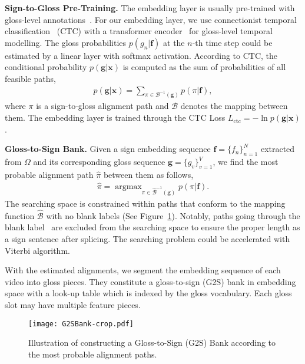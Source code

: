 \documentclass[final]{cvpr}
\begin{document}
\textbf{Sign-to-Gloss Pre-Training.}
The embedding layer is usually pre-trained with gloss-level annotations~\cite{slt-nslt-cihan18,slt-trans-cihan20}. 
For our embedding layer, we use connectionist temporal classification~\cite{CTCLoss} (CTC) with a transformer encoder~\cite{trans-vaswani17attention} for gloss-level temporal modelling.
The gloss probabilities $p(g_n|\mathbf{f})$ at the $n$-th time step could be estimated by a linear layer with softmax activation. 
According to CTC, the conditional probability $p(\mathbf{g} | \mathbf{x})$ is computed as the sum of probabilities of all feasible paths, 
\begin{align} \label{eq:gloss-predict}
   p(\mathbf{g} | \mathbf{x}) = \sum_{\pi \in \mathcal{B}^{-1}(\mathbf{g})}  p(\pi|\mathbf{f}),
\end{align}
where $\pi$ is a sign-to-gloss alignment path and $\mathcal{B}$ denotes the mapping between them. 
The embedding layer is trained through the CTC Loss $L_\text{ctc}=-\ln p(\mathbf{g}|\mathbf{x})$. 

\textbf{Gloss-to-Sign Bank.} 
Given a sign embedding sequence $\mathbf{f}=\{f_n\}_{n=1}^N$ extracted from $\Omega$ and its corresponding gloss sequence $\mathbf{g}=\{g_v\}_{v=1}^V$, 
we find the most probable alignment path $\hat{\pi}$ between them as follows, 
\begin{align} \label{eq:findpath}
   \hat{\pi} = \mathop{\arg\max}_{\pi \in \hat{\mathcal{B}}^{-1}(\mathbf{g})} p(\pi|\mathbf{f}).
\end{align}
The searching space is constrained within paths that conform to the mapping function $\hat{\mathcal{B}}$ with no blank labels (See Figure~\ref{fig:G2Sbank}). 
Notably, paths going through the blank label~\cite{CTCLoss} are excluded from the searching space to ensure the proper length as a sign sentence after splicing. 
The searching problem could be accelerated with Viterbi algorithm\cite{viterbi1967error,DPD_icme19}. 

With the estimated alignments, we segment the embedding sequence of each video into gloss pieces. 
They constitute a gloss-to-sign (G2S) bank in embedding space with a look-up table which is indexed by the gloss vocabulary. 
Each gloss slot may have multiple feature pieces. 

\begin{figure}[tp]
   \centering
   \texttt{[image: G2SBank-crop.pdf]}
   \caption{Illustration of constructing a Gloss-to-Sign (G2S) Bank according to the most probable alignment paths. 
   }\label{fig:G2Sbank}
\vspace{-8pt}
\end{figure}
\end{document}
